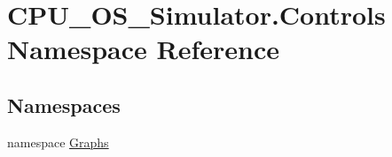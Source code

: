 \hypertarget{namespace_c_p_u___o_s___simulator_1_1_controls}{}\section{C\+P\+U\+\_\+\+O\+S\+\_\+\+Simulator.\+Controls Namespace Reference}
\label{namespace_c_p_u___o_s___simulator_1_1_controls}
\subsection*{Namespaces}
\begin{DoxyCompactItemize}
\item 
namespace \hyperlink{namespace_c_p_u___o_s___simulator_1_1_controls_1_1_graphs}{Graphs}
\end{DoxyCompactItemize}
